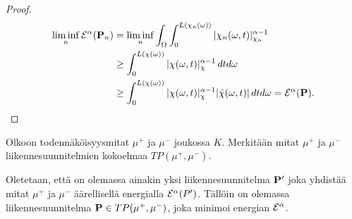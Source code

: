 \begin{proof}
    \begin{align*}
         \liminf_n \E^\alpha(\P_n) &=  \liminf_n \int_\Omega \int_0^{L(\chi_n(\omega))}|\chi_n(\omega, t)|_{\chi_n}^{\alpha-1} \\
         &\ge \int_0^{L(\chi(\omega))}|\chi(\omega, t)|_{\chi}^{\alpha-1} \, dtd\omega \\
         &\ge \int_0^{L(\chi(\omega))}|\chi(\omega, t)|_{\chi}^{\alpha-1}|\dot \chi(\omega, t)| \, dtd\omega = \E^\alpha(\P).
    \end{align*}
    
\end{proof}


\begin{theorem}
    Olkoon todennäköisyysmitat $\mu^+$ ja $\mu^-$ joukossa $K $. Merkitään mitat $\mu^+$ ja $\mu^-$  liikennesuunnitelmien kokoelmaa $TP(\mu^+, \mu^-)$.
    
    Oletetaan, että on olemassa ainakin yksi liikennesuunnitelma $\P'$ joka yhdistää mitat $\mu^+$ ja $\mu^-$ äärellisellä energialla $\E^\alpha(P')$. Tällöin on olemassa liikennesuunnitelma $\P \in TP(\mu^+, \mu^-)$, joka minimoi energian $\E^\alpha$.
    
\end{theorem}
